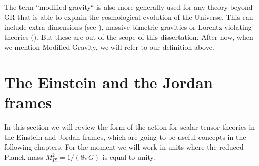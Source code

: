 The term ``modified gravity`` is also more generally used for
any theory beyond GR that is able to explain the cosmological evolution
of the Universe. This can include extra dimensions (see \cite{DGP}),
massive bimetric gravities \cite{cite bimetric stuff} or Lorentz-violating theories
(\cite{cite some by Blas, et al}). But these are out of the scope of this dissertation. After now, when we mention Modified Gravity, we will refer to our definition above.
%
 
\section{The Einstein and the Jordan frames \label{sec:Einstein-Jordan}}

In this section we will review the form of the action for scalar-tensor theories in the Einstein and Jordan frames,
which are going to be useful concepts in the following chapters. For the moment we will work in units where the reduced Planck mass
$M_{Pl}^{2} = 1/(8 \pi G)$ is equal to unity.

